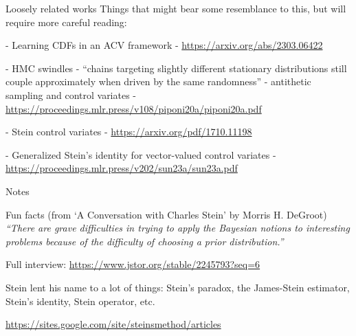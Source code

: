 \documentclass[usenames,dvipsnames]{beamer}
\theoremstyle{definition}
\begin{document}
\begin{frame}{Loosely related works}
    Things that might bear some resemblance to this, but will require more careful reading:

    - Learning CDFs in an ACV framework -  \url{https://arxiv.org/abs/2303.06422}

    - HMC swindles - ``chains targeting slightly different stationary distributions still couple approximately when driven by the same randomness'' - antithetic sampling and control variates - \url{https://proceedings.mlr.press/v108/piponi20a/piponi20a.pdf}

    - Stein control variates - \url{https://arxiv.org/pdf/1710.11198}

    - Generalized Stein's identity for vector-valued control variates - \url{https://proceedings.mlr.press/v202/sun23a/sun23a.pdf}

    
\end{frame}




    

    


\begin{frame}{Notes}

\end{frame}




    


\begin{frame}{Fun facts}
    (from `A Conversation with Charles Stein' by Morris H. DeGroot)
    \emph{``There are grave difficulties in trying to apply the Bayesian notions to interesting problems because of the difficulty of choosing a prior distribution.''}
    
      
    Full interview: \url{https://www.jstor.org/stable/2245793?seq=6}
    
    Stein lent his name to a lot of things: Stein's paradox, the James-Stein estimator, Stein's identity, Stein operator, etc.
    
    \url{https://sites.google.com/site/steinsmethod/articles}
    
\end{frame}
\end{document}
